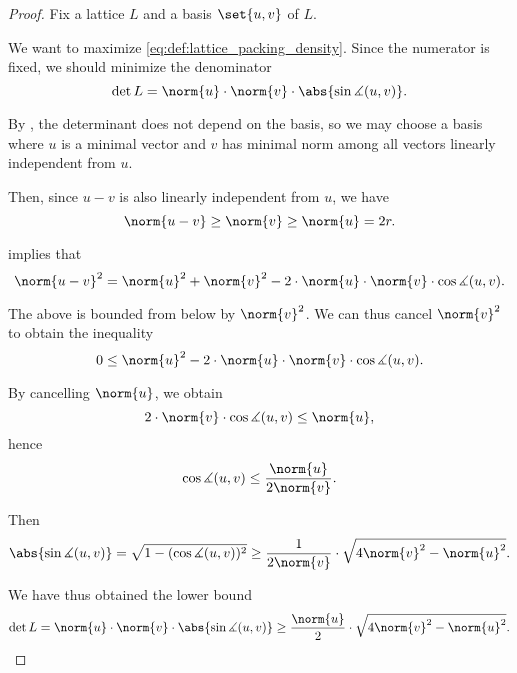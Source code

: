 \begin{proof}
  Fix a lattice \( L \) and a basis \( \set{ u, v } \) of \( L \).

  We want to maximize \eqref{eq:def:lattice_packing_density}. Since the numerator is fixed, we should minimize the denominator
  \begin{equation*}
    \det L = \norm{u} \cdot \norm{v} \cdot \abs{\sin\measuredangle(u, v)}.
  \end{equation*}

  By , the determinant does not depend on the basis, so we may choose a basis where \( u \) is a minimal vector and \( v \) has minimal norm among all vectors linearly independent from \( u \).

  Then, since \( u - v \) is also linearly independent from \( u \), we have
  \begin{equation*}
    \norm{u - v} \geq \norm{v} \geq \norm{u} = 2r.
  \end{equation*}

   implies that
  \begin{equation*}
    \norm{u - v}^2 = \norm{u}^2 + \norm{v}^2 - 2 \cdot \norm{u} \cdot \norm{v} \cdot \cos \measuredangle(u, v).
  \end{equation*}

  The above is bounded from below by \( \norm{v}^2 \). We can thus cancel \( \norm{v}^2 \) to obtain the inequality
  \begin{equation*}
    0 \leq \norm{u}^2 - 2 \cdot \norm{u} \cdot \norm{v} \cdot \cos \measuredangle(u, v).
  \end{equation*}

  By cancelling \( \norm{u} \), we obtain
  \begin{equation*}
    2 \cdot \norm{v} \cdot \cos \measuredangle(u, v) \leq \norm{u},
  \end{equation*}
  hence
  \begin{equation*}
    \cos \measuredangle(u, v) \leq \frac {\norm{u}} {2\norm{v}}.
  \end{equation*}

  Then
  \begin{equation*}
    \abs{\sin \measuredangle(u, v)}
    =
    \sqrt{ 1 - (\cos \measuredangle(u, v))^2 }
    \geq
    \frac 1 {2\norm{v}} \cdot \sqrt{ 4\norm{v}^2 - \norm{u}^2 }.
  \end{equation*}

  We have thus obtained the lower bound
  \begin{equation*}
    \det L = \norm{u} \cdot \norm{v} \cdot \abs{\sin\measuredangle(u, v)} \geq \frac {\norm {u}} 2 \cdot \sqrt{ 4\norm{v}^2- \norm{u}^2 }.
  \end{equation*}


\end{proof}
